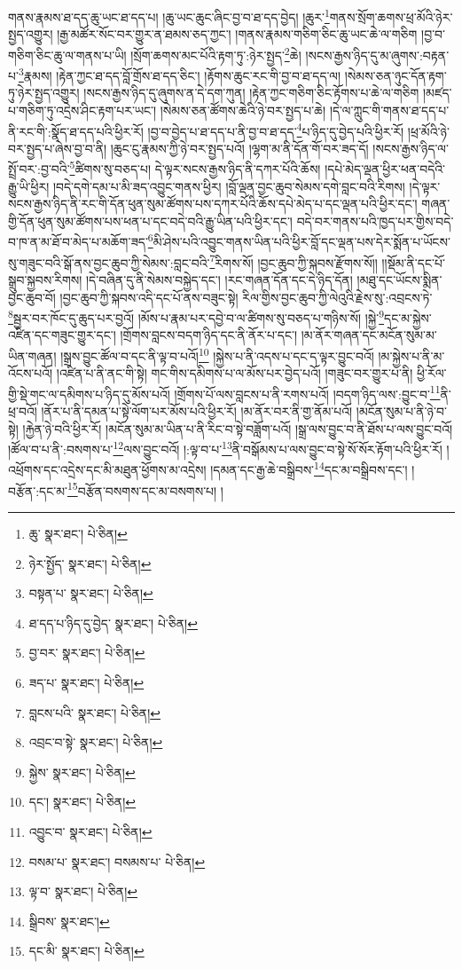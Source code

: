 གནས་རྣམས་ཐ་དད་ཆུ་ཡང་ཐ་དད་པ། །ཆུ་ཡང་ཆུང་ཞིང་བྱ་བ་ཐ་དད་བྱེད། །ཆུར་\footnote{ཆུ་  སྣར་ཐང་།  པེ་ཅིན། }གནས་སྲོག་ཆགས་ཕྲ་མོའི་ཉེར་སྤྱད་འགྱུར། །རྒྱ་མཚོར་སོང་བར་གྱུར་ན་ཐམས་ཅད་ཀྱང་། །གནས་རྣམས་གཅིག་ཅིང་ཆུ་ཡང་ཆེ་ལ་གཅིག །བྱ་བ་གཅིག་ཅིང་ཆུ་ལ་གནས་པ་ཡི། །སྲོག་ཆགས་མང་པོའི་རྟག་ཏུ་:ཉེར་སྤྱད་\footnote{ཉེར་སྤྱོད་  སྣར་ཐང་།  པེ་ཅིན། }ཆེ། །སངས་རྒྱས་ཉིད་དུ་མ་ཞུགས་:བརྟན་པ་\footnote{བསྟན་པ་  སྣར་ཐང་།  པེ་ཅིན། }རྣམས། །རྟེན་ཀྱང་ཐ་དད་བློ་གྲོས་ཐ་དད་ཅིང་། །རྟོགས་ཆུང་རང་གི་བྱ་བ་ཐ་དད་ལ། །སེམས་ཅན་ཉུང་དོན་རྟག་ཏུ་ཉེར་སྤྱད་འགྱུར། །སངས་རྒྱས་ཉིད་དུ་ཞུགས་ན་དེ་དག་ཀུན། །རྟེན་ཀྱང་གཅིག་ཅིང་རྟོགས་པ་ཆེ་ལ་གཅིག །མཛད་པ་གཅིག་ཏུ་འདྲེས་ཤིང་རྟག་པར་ཡང་། །སེམས་ཅན་ཚོགས་ཆེའི་ཉེ་བར་སྤྱད་པ་ཆེ། །དེ་ལ་ཀླུང་གི་གནས་ཐ་དད་པ་ནི་རང་གི་:སྣོད་ཐ་དད་པའི་ཕྱིར་རོ། །བྱ་བ་བྱེད་པ་ཐ་དད་པ་ནི་བྱ་བ་ཐ་དད་\footnote{ཐ་དད་པ་ཉིད་དུ་བྱེད་  སྣར་ཐང་།  པེ་ཅིན། }པ་ཉིད་དུ་བྱེད་པའི་ཕྱིར་རོ། །ཕྲ་མོའི་ཉེ་བར་སྤྱད་པ་ཞེས་བྱ་བ་ནི། །ཆུང་ངུ་རྣམས་ཀྱི་ཉེ་བར་སྤྱད་པའོ། །ལྷག་མ་ནི་དོན་གོ་བར་ཟད་དོ། །སངས་རྒྱས་ཉིད་ལ་སྤྲོ་བར་:བྱ་བའི་\footnote{བྱ་བར་  སྣར་ཐང་།  པེ་ཅིན། }ཚིགས་སུ་བཅད་པ། དེ་ལྟར་སངས་རྒྱས་ཉིད་ནི་དཀར་པོའི་ཆོས། །དཔེ་མེད་ལྡན་ཕྱིར་ཕན་བདེའི་རྒྱུ་ཡི་ཕྱིར། །བདེ་དགེ་དམ་པ་མི་ཟད་འབྱུང་གནས་ཕྱིར། །བློ་ལྡན་བྱང་ཆུབ་སེམས་དགེ་བླང་བའི་རིགས། །དེ་ལྟར་སངས་རྒྱས་ཉིད་ནི་རང་གི་དོན་ཕུན་སུམ་ཚོགས་པས་དཀར་པོའི་ཆོས་དཔེ་མེད་པ་དང་ལྡན་པའི་ཕྱིར་དང་། གཞན་གྱི་དོན་ཕུན་སུམ་ཚོགས་པས་ཕན་པ་དང་བདེ་བའི་རྒྱུ་ཡིན་པའི་ཕྱིར་དང་། བདེ་བར་གནས་པའི་ཁྱད་པར་གྱིས་བདེ་བ་ཁ་ན་མ་ཐོ་བ་མེད་པ་མཆོག་ཟད་\footnote{ཟད་པ་  སྣར་ཐང་།  པེ་ཅིན། }མི་ཤེས་པའི་འབྱུང་གནས་ཡིན་པའི་ཕྱིར་བློ་དང་ལྡན་པས་དེར་སྨོན་པ་ཡོངས་སུ་གཟུང་བའི་སྒོ་ནས་བྱང་ཆུབ་ཀྱི་སེམས་:བླང་བའི་\footnote{བླངས་པའི་  སྣར་ཐང་།  པེ་ཅིན། }རིགས་སོ། །བྱང་ཆུབ་ཀྱི་སྐབས་རྫོགས་སོ།། །།སྡོམ་ནི་དང་པོ་སྒྲུབ་སྐྱབས་རིགས། །དེ་བཞིན་དུ་ནི་སེམས་བསྐྱེད་དང་། །རང་གཞན་དོན་དང་དེ་ཉིད་དོན། །མཐུ་དང་ཡོངས་སྨིན་བྱང་ཆུབ་བོ། །བྱང་ཆུབ་ཀྱི་སྐབས་འདི་དང་པོ་ནས་བཟུང་སྟེ། རིལ་གྱིས་བྱང་ཆུབ་ཀྱི་ལེའུའི་རྗེས་སུ་:འབྲངས་ཏེ་\footnote{འབྲང་བ་སྟེ་  སྣར་ཐང་།  པེ་ཅིན། }སྦྱར་བར་ཁོང་དུ་ཆུད་པར་བྱའོ། །མོས་པ་རྣམ་པར་དབྱེ་བ་ལ་ཚིགས་སུ་བཅད་པ་གཉིས་སོ། །སྐྱེ་\footnote{སྐྱེས་  སྣར་ཐང་།  པེ་ཅིན། }དང་མ་སྐྱེས་འཛིན་དང་གཟུང་གྱུར་དང་། །གྲོགས་བླངས་བདག་ཉིད་དང་ནི་ནོར་པ་དང་། །མ་ནོར་གཞན་དང་མངོན་སུམ་མ་ཡིན་གཞན། །སྒྲས་བྱུང་ཚོལ་བ་དང་ནི་ལྟ་བ་པའོ།\footnote{དང་།  སྣར་ཐང་།  པེ་ཅིན། } །སྐྱེས་པ་ནི་འདས་པ་དང་ད་ལྟར་བྱུང་བའོ། །མ་སྐྱེས་པ་ནི་མ་འོངས་པའོ། །འཛིན་པ་ནི་ནང་གི་སྟེ། གང་གིས་དམིགས་པ་ལ་མོས་པར་བྱེད་པའོ། །གཟུང་བར་གྱུར་པ་ནི། ཕྱི་རོལ་གྱི་སྡེ་གང་ལ་དམིགས་པ་ཉིད་དུ་མོས་པའོ། །གྲོགས་པོ་ལས་བླངས་པ་ནི་རགས་པའོ། །བདག་ཉིད་ལས་:བྱུང་བ་\footnote{འབྱུང་བ་  སྣར་ཐང་།  པེ་ཅིན། }ནི་ཕྲ་བའོ། །ནོར་པ་ནི་དམན་པ་སྟེ་ལོག་པར་མོས་པའི་ཕྱིར་རོ། །མ་ནོར་བར་ནི་གྱ་ནོམ་པའོ། །མངོན་སུམ་པ་ནི་ཉེ་བ་སྟེ། །རྐྱེན་ཉེ་བའི་ཕྱིར་རོ། །མངོན་སུམ་མ་ཡིན་པ་ནི་རིང་བ་སྟེ་བཟློག་པའོ། །སྒྲ་ལས་བྱུང་བ་ནི་ཐོས་པ་ལས་བྱུང་བའོ། །ཚོལ་བ་པ་ནི་:བསགས་པ་\footnote{བསམ་པ་  སྣར་ཐང་། བསམས་པ་  པེ་ཅིན། }ལས་བྱུང་བའོ། །:ལྟ་བ་པ་\footnote{ལྟ་བ་  སྣར་ཐང་།  པེ་ཅིན། }ནི་བསྒོམས་པ་ལས་བྱུང་བ་སྟེ་སོ་སོར་རྟོག་པའི་ཕྱིར་རོ། །འཕྲོགས་དང་འདྲེས་དང་མི་མཐུན་ཕྱོགས་མ་འདྲེས། །དམན་དང་རྒྱ་ཆེ་བསྒྲིབས་\footnote{སྒྲིབས་  སྣར་ཐང་། }དང་མ་བསྒྲིབས་དང་། །བརྩོན་:དང་མ་\footnote{དང་མི་  སྣར་ཐང་།  པེ་ཅིན། }བརྩོན་བསགས་དང་མ་བསགས་པ། །
